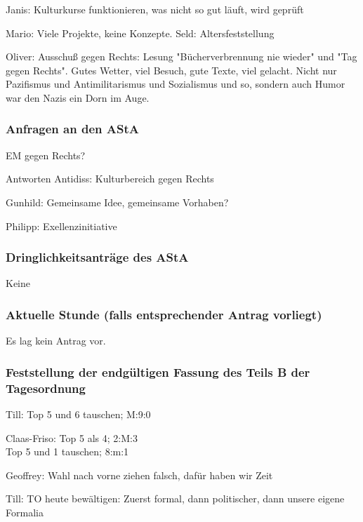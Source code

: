 \documentclass[ngerman,headheight=70pt]{scrartcl}
\begin{document}
    Janis: Kulturkurse funktionieren, was nicht so gut läuft, wird geprüft

    Mario: Viele Projekte, keine Konzepte. Seld: Altersfeststellung

    Oliver: Ausschuß gegen Rechts: Lesung "Bücherverbrennung nie wieder" und
    "Tag gegen Rechts". Gutes Wetter, viel Besuch, gute Texte, viel gelacht.
    Nicht nur Pazifismus und Antimilitarismus und Sozialismus und so, sondern auch
    Humor war den Nazis ein Dorn im Auge.

    \subsubsection{Anfragen an den AStA}

    EM gegen Rechts?

    Antworten Antidiss: Kulturbereich gegen Rechts

    Gunhild: Gemeinsame Idee, gemeinsame Vorhaben?

    Philipp: Exellenzinitiative

    \subsubsection{Dringlichkeitsanträge des AStA}

    Keine

    \subsubsection{Aktuelle Stunde (falls entsprechender Antrag vorliegt)}

    Es lag kein Antrag vor.

    \subsubsection{Feststellung der endgültigen Fassung des Teils B der Tagesordnung}

    Till: Top 5 und 6 tauschen; M:9:0

    Claas-Friso: Top 5 als 4; 2:M:3 \\
                 Top 5 und 1 tauschen; 8:m:1

    Geoffrey: Wahl nach vorne ziehen falsch, dafür haben wir Zeit

    Till: TO heute bewältigen: Zuerst formal, dann politischer, dann unsere eigene Formalia
\end{document}
